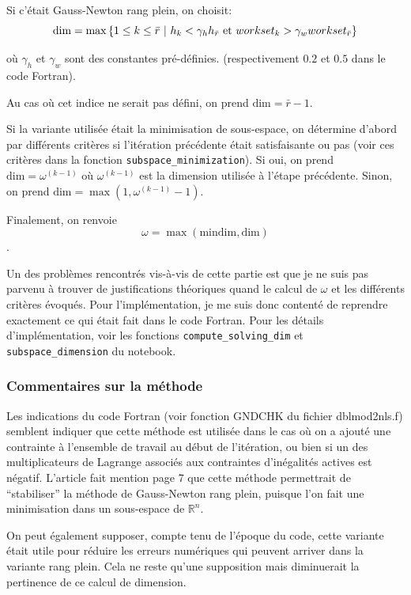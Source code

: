 \documentclass[a4paper,11pt]{article}
\newcommand{\real}{\mathbb{R}}
\numberwithin{equation}{section}
\def\mfabian#1{{\color{blue} #1}}
\begin{document}
Si c'était Gauss-Newton rang plein, on choisit:
$$
\text{dim}= \max \left\{ 1\leq k \leq \bar{r}\ | \ h_{k} < \gamma_{h}h_{\bar{r}} \text{ et } workset_{k} > \gamma_{w}workset_{\bar{r}} \right\}
$$

où $\gamma_{h}$ et $\gamma_{w}$ sont des constantes pré-définies. (respectivement $0.2$ et $0.5$ dans le code Fortran).

Au cas où cet indice ne serait pas défini, on prend $\text{dim}=\bar{r}-1$.

Si la variante utilisée était la minimisation de sous-espace, on détermine d'abord par différents critères si l'itération précédente était satisfaisante ou pas (voir ces critères dans la fonction \texttt{subspace\_minimization}). Si oui, on prend  $\text{dim}=\omega^{(k-1)}$ où $\omega^{(k-1)}$ est la dimension utilisée à l'étape précédente. Sinon, on prend $\text{dim}=\max(1,\omega^{(k-1)}-1)$.

Finalement, on renvoie
$$\omega = \max(\text{mindim},\text{dim})$$.
 
 
Un des problèmes rencontrés vis-à-vis de cette partie est que je ne suis pas parvenu à trouver de justifications théoriques quand le calcul de $\omega$ et les différents critères évoqués. Pour l'implémentation, je me suis donc contenté de reprendre exactement ce qui était fait dans le code Fortran. Pour les détails d'implémentation, voir les fonctions \texttt{compute\_solving\_dim} et \texttt{subspace\_dimension} du notebook.


\subsubsection{Commentaires sur la méthode}

Les indications du code Fortran (voir fonction GNDCHK du fichier dblmod2nls.f) semblent indiquer que cette méthode est utilisée dans le cas où on a ajouté une contrainte à l'ensemble de travail au début de l'itération, ou bien si un des multiplicateurs de Lagrange associés aux contraintes d'inégalités actives est négatif. L'article \cite{lindstromwedin1988} fait mention page 7 que cette méthode permettrait de \mfabian{``stabiliser''} la méthode de Gauss-Newton rang plein, puisque l'on fait une minimisation dans un sous-espace de $\real^{n}$. 

On peut également supposer, compte tenu de l'époque du code, cette variante était utile pour réduire les erreurs numériques qui peuvent arriver dans la variante rang plein. Cela ne reste qu'une supposition mais diminuerait la pertinence de ce calcul de dimension.
\end{document}
